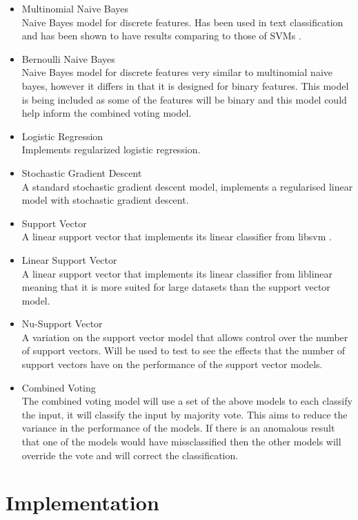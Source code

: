 \documentclass[11pt,oneside]{book}
\begin{document}
\begin{itemize}
\item Multinomial Naive Bayes \\
Naive Bayes model for discrete features. Has been used in text classification and has been shown to have results comparing to those of SVMs \citep{MNB}.
\item Bernoulli Naive Bayes \\
Naive Bayes model for discrete features very similar to multinomial naive bayes, however it differs in that it is designed for binary features. This model is being included as some of the features will be binary and this model could help inform the combined voting model. 
\item Logistic Regression \\
Implements regularized logistic regression.
\item Stochastic Gradient Descent \\
A standard stochastic gradient descent model, implements a regularised linear model with stochastic gradient descent.
\item Support Vector \\
A linear support vector that implements its linear classifier from libsvm \citep{libsvm}.
\item Linear Support Vector \\
A linear support vector that implements its linear classifier from liblinear \citep{liblinear} meaning that it is more suited for large datasets than the support vector model.
\item Nu-Support Vector \\
A variation on the support vector model that allows control over the number of support vectors. Will be used to test to see the effects that the number of support vectors have on the performance of the support vector models.
\item Combined Voting \\
The combined voting model will use a set of the above models to each classify the input, it will classify the input by majority vote. This aims to reduce the variance in the performance of the models. If there is an anomalous result that one of the models would have missclassified then the other models will override the vote and will correct the classification.
\end{itemize}

\section{Implementation}
\end{document}
